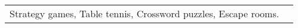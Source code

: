 \begin{tabularx}{\linewidth}{@{}l X@{}}
    Strategy games, Table tennis, Crossword puzzles, Escape rooms.
\end{tabularx}